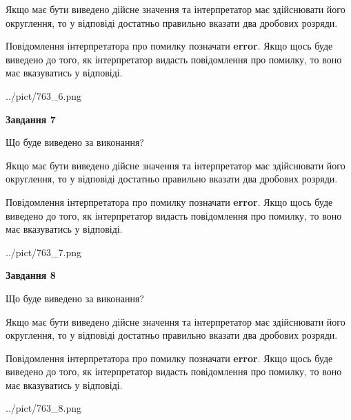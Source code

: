\documentclass[12pt, ukrainian]{article}
\begin{document}
{\begin {Large}
Якщо має бути виведено дійсне значення та інтерпретатор має здійснювати його округлення, 
то у відповіді достатньо правильно вказати два дробових розряди.

Повідомлення інтерпретатора про помилку позначати \textbf{error}.
Якщо щось буде виведено до того, як інтерпретатор видасть повідомлення про помилку, 
то воно має вказуватись у відповіді. \par

\begin{center}
	{../pict/763_6.png}
\end{center}
\newpage

{\begin {center}\textbf{Завдання 7}\end {center}}\par
Що буде виведено за виконання? \par

Якщо має бути виведено дійсне значення та інтерпретатор має здійснювати його округлення, 
то у відповіді достатньо правильно вказати два дробових розряди.

Повідомлення інтерпретатора про помилку позначати \textbf{error}.
Якщо щось буде виведено до того, як інтерпретатор видасть повідомлення про помилку, 
то воно має вказуватись у відповіді. \par

\begin{center}
	{../pict/763_7.png}
\end{center}
\newpage

{\begin {center}\textbf{Завдання 8}\end {center}}\par
Що буде виведено за виконання? \par

Якщо має бути виведено дійсне значення та інтерпретатор має здійснювати його округлення, 
то у відповіді достатньо правильно вказати два дробових розряди.

Повідомлення інтерпретатора про помилку позначати \textbf{error}.
Якщо щось буде виведено до того, як інтерпретатор видасть повідомлення про помилку, 
то воно має вказуватись у відповіді. \par

\begin{center}
	{../pict/763_8.png}
\end{center}
\newpage


\end{Large}}
\end{document}

